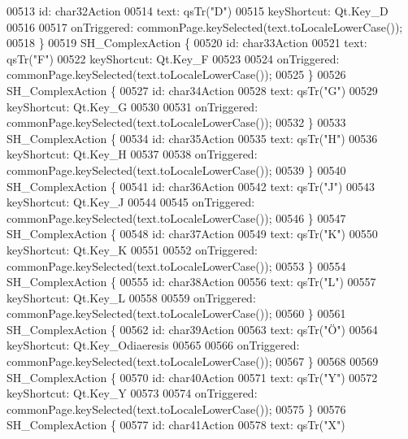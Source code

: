 \begin{DoxyCode}
00513         \textcolor{keywordtype}{id}: char32Action
00514         text: qsTr(\textcolor{stringliteral}{"D"})
00515         keyShortcut: Qt.Key\_D
00516 
00517         onTriggered: commonPage.keySelected(text.toLocaleLowerCase());
00518     \}
00519     SH\_ComplexAction \{
00520         \textcolor{keywordtype}{id}: char33Action
00521         text: qsTr(\textcolor{stringliteral}{"F"})
00522         keyShortcut: Qt.Key\_F
00523 
00524         onTriggered: commonPage.keySelected(text.toLocaleLowerCase());
00525     \}
00526     SH\_ComplexAction \{
00527         \textcolor{keywordtype}{id}: char34Action
00528         text: qsTr(\textcolor{stringliteral}{"G"})
00529         keyShortcut: Qt.Key\_G
00530 
00531         onTriggered: commonPage.keySelected(text.toLocaleLowerCase());
00532     \}
00533     SH\_ComplexAction \{
00534         \textcolor{keywordtype}{id}: char35Action
00535         text: qsTr(\textcolor{stringliteral}{"H"})
00536         keyShortcut: Qt.Key\_H
00537 
00538         onTriggered: commonPage.keySelected(text.toLocaleLowerCase());
00539     \}
00540     SH\_ComplexAction \{
00541         \textcolor{keywordtype}{id}: char36Action
00542         text: qsTr(\textcolor{stringliteral}{"J"})
00543         keyShortcut: Qt.Key\_J
00544 
00545         onTriggered: commonPage.keySelected(text.toLocaleLowerCase());
00546     \}
00547     SH\_ComplexAction \{
00548         \textcolor{keywordtype}{id}: char37Action
00549         text: qsTr(\textcolor{stringliteral}{"K"})
00550         keyShortcut: Qt.Key\_K
00551 
00552         onTriggered: commonPage.keySelected(text.toLocaleLowerCase());
00553     \}
00554     SH\_ComplexAction \{
00555         \textcolor{keywordtype}{id}: char38Action
00556         text: qsTr(\textcolor{stringliteral}{"L"})
00557         keyShortcut: Qt.Key\_L
00558 
00559         onTriggered: commonPage.keySelected(text.toLocaleLowerCase());
00560     \}
00561     SH\_ComplexAction \{
00562         \textcolor{keywordtype}{id}: char39Action
00563         text: qsTr(\textcolor{stringliteral}{"Ö"})
00564         keyShortcut: Qt.Key\_Odiaeresis
00565 
00566         onTriggered: commonPage.keySelected(text.toLocaleLowerCase());
00567     \}
00568 
00569     SH\_ComplexAction \{
00570         \textcolor{keywordtype}{id}: char40Action
00571         text: qsTr(\textcolor{stringliteral}{"Y"})
00572         keyShortcut: Qt.Key\_Y
00573 
00574         onTriggered: commonPage.keySelected(text.toLocaleLowerCase());
00575     \}
00576     SH\_ComplexAction \{
00577         \textcolor{keywordtype}{id}: char41Action
00578         text: qsTr(\textcolor{stringliteral}{"X"})

\end{DoxyCode}

